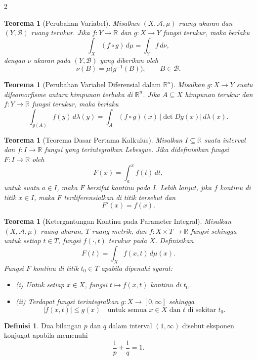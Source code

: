 \documentclass[a4paper,extrafontsizes, 9pt]{memoir}
\theoremstyle{definition}
\newtheorem{definisi}[kalstok]{Definisi}
\theoremstyle{plain}
\newtheorem{teorema}[kalstok]{Teorema}
\theoremstyle{remark}
\begin{document}
\begin{multicols}{2}
  \begin{teorema}[Perubahan Variabel]
    Misalkan $(X,\mathcal{A},\mu)$ ruang ukuran dan $(Y,\mathcal{B})$ ruang terukur.
    Jika $f:Y\to\mathbb{R}$ dan $g:X\to Y$ fungsi terukur, maka berlaku
    \[\int_X (f\circ g)\,d\mu=\int_Y f\,d\nu,\]
    dengan $\nu$ ukuran pada $(Y,\mathcal{B})$ yang diberikan oleh
    \[\nu(B)=\mu\bigl(g^{-1}(B)\bigr),\qquad B\in\mathcal{B}.\]
  \end{teorema}

  \begin{teorema}[Perubahan Variabel Diferensial dalam $\mathbb{R}^{n}$]
    Misalkan $g:X\to Y$ suatu difeomorfisme antara himpunan terbuka di $\mathbb{R}^{n}$.
    Jika $A\subseteq X$ himpunan terukur dan $f:Y\to\mathbb{R}$ fungsi terukur, maka berlaku
    \[\int_{g(A)} f(y)\,d\lambda(y)
      =\int_A (f\circ g)(x)\,|\det Dg(x)|\,d\lambda(x).\]
  \end{teorema}

  \begin{teorema}[Teorema Dasar Pertama Kalkulus]
    Misalkan $I\subseteq\mathbb{R}$ suatu interval dan $f:I\to\mathbb{R}$ fungsi yang terintegralkan Lebesgue.
    Jika didefinisikan fungsi $F:I\to\mathbb{R}$ oleh
    \[F(x)=\int_a^x f(t)\,dt,\]
    untuk suatu $a\in I$, maka $F$ bersifat kontinu pada $I$.
    Lebih lanjut, jika $f$ kontinu di titik $x\in I$, maka $F$ terdiferensialkan di titik tersebut dan
    \[F'(x)=f(x).\]
  \end{teorema}

  \begin{teorema}[Ketergantungan Kontinu pada Parameter Integral]
    Misalkan $(X,\mathcal{A},\mu)$ ruang ukuran, $T$ ruang metrik, dan $f:X\times T\to\mathbb{R}$ fungsi
    sehingga untuk setiap $t\in T$, fungsi $f(\cdot,t)$ terukur pada $X$. Definisikan
    \[F(t)=\int_X f(x,t)\,d\mu(x).\]
    Fungsi $F$ kontinu di titik $t_0\in T$ apabila dipenuhi syarat:
    \begin{itemize}[leftmargin=*, itemsep=0.5mm]
      \item (i) Untuk setiap $x\in X$, fungsi $t\mapsto f(x,t)$ kontinu di $t_0$.
      \item (ii) Terdapat fungsi terintegralkan $g:X\to[0,\infty]$ sehingga
            \[|f(x,t)|\le g(x)\quad\text{untuk semua }x\in X\text{ dan }t\text{ di sekitar }t_0.\]
    \end{itemize}
  \end{teorema}

  \begin{definisi}
    Dua bilangan $p$ dan $q$ dalam interval $(1,\infty)$ disebut eksponen konjugat apabila memenuhi
    \[\frac{1}{p}+\frac{1}{q}=1.\]
  \end{definisi}


\end{multicols}
\end{document}
